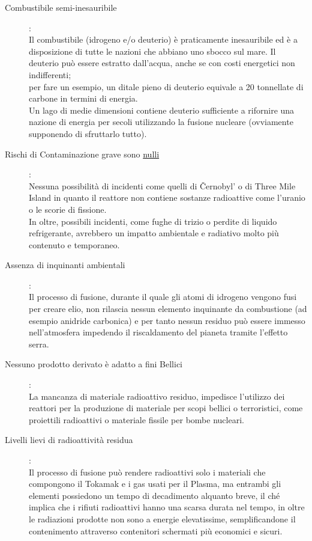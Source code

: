 \begin{description}
	\item [Combustibile semi-inesauribile]:\\
	      Il combustibile (idrogeno e/o deuterio) è praticamente inesauribile ed è a disposizione di tutte le nazioni che abbiano uno sbocco sul mare. Il deuterio può essere estratto dall'acqua, anche se con costi energetici non indifferenti;\\
	      per fare un esempio, un ditale pieno di deuterio equivale a 20 tonnellate di carbone in termini di energia.\\
	      Un lago di medie dimensioni contiene deuterio sufficiente a rifornire una nazione di energia per secoli utilizzando la fusione nucleare (ovviamente supponendo di sfruttarlo tutto).
	\item [Rischi di Contaminazione grave sono \underline{nulli}]:\\
	      Nessuna possibilità di incidenti come quelli di Černobyl' o di Three Mile Island in quanto il reattore non contiene sostanze radioattive come l'uranio o le scorie di fissione.\\
	      In oltre, possibili incidenti, come fughe di trizio o perdite di liquido refrigerante, avrebbero un impatto ambientale e radiativo molto più contenuto e temporaneo.
	\item [Assenza di inquinanti ambientali]:\\
	      Il processo di fusione, durante il quale gli atomi di idrogeno vengono fusi per creare elio, non rilascia nessun elemento inquinante da combustione (ad esempio anidride carbonica) e per tanto nessun residuo può essere immesso nell'atmosfera impedendo il riscaldamento del pianeta tramite l'effetto serra.
	\item [Nessuno prodotto derivato è adatto a fini Bellici]:\\
	      La mancanza di materiale radioattivo residuo, impedisce l'utilizzo dei reattori per la produzione di materiale per scopi bellici o terroristici, come proiettili radioattivi o materiale fissile per bombe nucleari.
	\item [Livelli lievi di radioattività residua]:\\
	      Il processo di fusione può rendere radioattivi solo i materiali che compongono il Tokamak e i gas usati per il Plasma, ma entrambi gli elementi possiedono un tempo di decadimento alquanto breve, il ché implica che i rifiuti radioattivi hanno una scarsa durata nel tempo, in oltre le radiazioni prodotte non sono a energie elevatissime, semplificandone il contenimento attraverso contenitori schermati più economici e sicuri.
\end{description}
